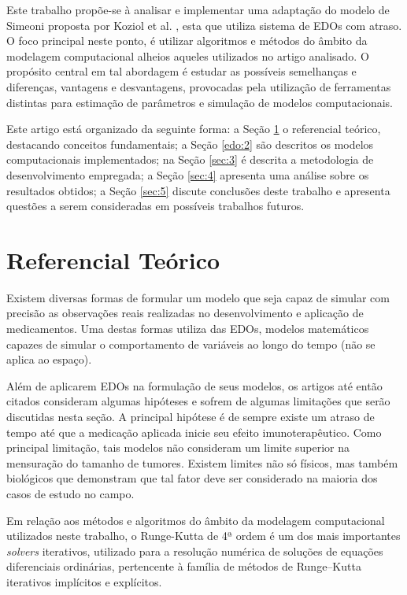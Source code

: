 \documentclass[12pt]{article}
\begin{document}
Este trabalho propõe-se à analisar e implementar uma adaptação do modelo de Simeoni proposta por Koziol et al. \cite{my}, esta que utiliza sistema de EDOs com atraso. O foco principal neste ponto, é utilizar algoritmos e métodos do âmbito da modelagem computacional alheios aqueles utilizados no artigo analisado. O propósito central em tal abordagem é estudar as possíveis semelhanças e diferenças, vantagens e desvantagens, provocadas pela utilização de ferramentas distintas para estimação de parâmetros e simulação de modelos computacionais.

Este artigo está organizado da seguinte forma: a Seção \ref{sec:1} o referencial teórico, destacando conceitos fundamentais; a Seção \ref{edo:2} são descritos os modelos computacionais implementados; na Seção \ref{sec:3} é descrita a metodologia de desenvolvimento empregada; a Seção \ref{sec:4} apresenta uma análise sobre os resultados obtidos; a Seção \ref{sec:5} discute conclusões deste trabalho e apresenta questões a serem consideradas em possíveis trabalhos futuros.

\section{Referencial Teórico} \label{sec:1}

Existem diversas formas de formular um modelo que seja capaz de simular com precisão as observações reais realizadas no desenvolvimento e aplicação de medicamentos. Uma destas formas utiliza das EDOs, modelos matemáticos capazes de simular o comportamento de variáveis ao longo do tempo (não se aplica ao espaço).

Além de aplicarem EDOs na formulação de seus modelos, os artigos até então citados consideram algumas hipóteses e sofrem de algumas limitações que serão discutidas nesta seção. A principal hipótese é de sempre existe um atraso de tempo até que a medicação aplicada inicie seu efeito imunoterapêutico. Como principal limitação, tais modelos não consideram um limite superior na mensuração do tamanho de tumores. Existem limites não só físicos, mas também biológicos que demonstram que tal fator deve ser considerado na maioria dos casos de estudo no campo.

Em relação aos métodos e algoritmos do âmbito da modelagem computacional utilizados neste trabalho, o Runge-Kutta de 4ª ordem é um dos mais importantes \emph{solvers} iterativos, utilizado para a resolução numérica de soluções de equações diferenciais ordinárias, pertencente à família de métodos de Runge–Kutta \cite{BUTCHER1996247} iterativos implícitos e explícitos.
\end{document}
